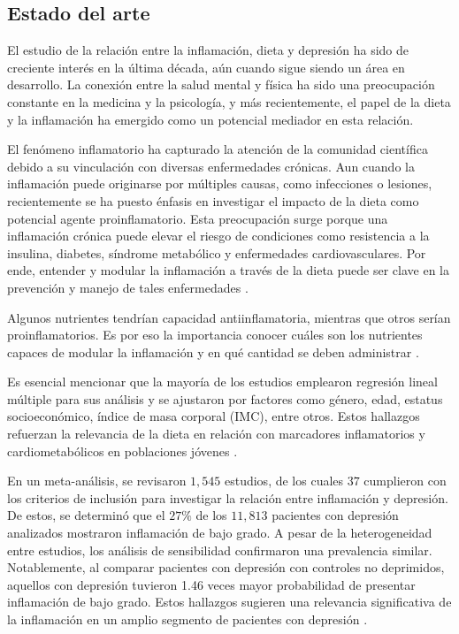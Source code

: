 \documentclass[man]{apa7}
\begin{document}
	\subsection{Estado del arte}

	El estudio de la relación entre la inflamación, dieta y depresión ha
	sido de creciente interés en la última década, aún cuando sigue siendo un área en
	desarrollo. La conexión entre la salud mental y física ha sido una
	preocupación constante en la medicina y la psicología, y más
	recientemente, el papel de la dieta y la inflamación ha emergido como un
	potencial mediador en esta relación.

	El fenómeno inflamatorio ha capturado la atención de la comunidad
	científica debido a su vinculación con diversas enfermedades crónicas.
	Aun cuando la inflamación puede originarse por múltiples causas, como
	infecciones o lesiones, recientemente se ha puesto énfasis en investigar
	el impacto de la dieta como potencial agente proinflamatorio. Esta
	preocupación surge porque una inflamación crónica puede elevar el riesgo
	de condiciones como resistencia a la insulina, diabetes, síndrome
	metabólico y enfermedades cardiovasculares. Por ende, entender y modular
	la inflamación a través de la dieta puede ser clave en la prevención y
	manejo de tales enfermedades \parencites{daneshLowGradeInflammation2000}{ridkerHighsensitivityCreactiveProtein2004}{salas-salvadoConjugatedLinoleicAcid2006}.

	Algunos nutrientes tendrían capacidad antiinflamatoria, mientras que
	otros serían proinflamatorios. Es por eso la importancia conocer cuáles
	son los nutrientes capaces de modular la inflamación y en qué cantidad
	se deben administrar \parencite{giuglianoMetabolicCardiovascularEffects1997}.

	Es esencial mencionar que la mayoría de los estudios emplearon regresión
	lineal múltiple para sus análisis y se ajustaron por factores como
	género, edad, estatus socioeconómico, índice de masa corporal (IMC),
	entre otros. Estos hallazgos refuerzan la relevancia de la dieta en
	relación con marcadores inflamatorios y cardiometabólicos en poblaciones
	jóvenes \parencite{cotaCardiometabolicRiskHealth2021}.

	En un meta-análisis, se revisaron $1,545$ estudios, de los cuales $37$
	cumplieron con los criterios de inclusión para investigar la relación
	entre inflamación y depresión. De estos, se determinó que el $27\%$ de los
	$11,813$ pacientes con depresión analizados mostraron inflamación de bajo
	grado. A pesar de la heterogeneidad entre estudios, los análisis de
	sensibilidad confirmaron una prevalencia similar. Notablemente, al
	comparar pacientes con depresión con controles no deprimidos, aquellos
	con depresión tuvieron 1.46 veces mayor probabilidad de presentar
	inflamación de bajo grado. Estos hallazgos sugieren una relevancia
	significativa de la inflamación en un amplio segmento de pacientes con
	depresión \parencite{Osimo2019}.
\end{document}
